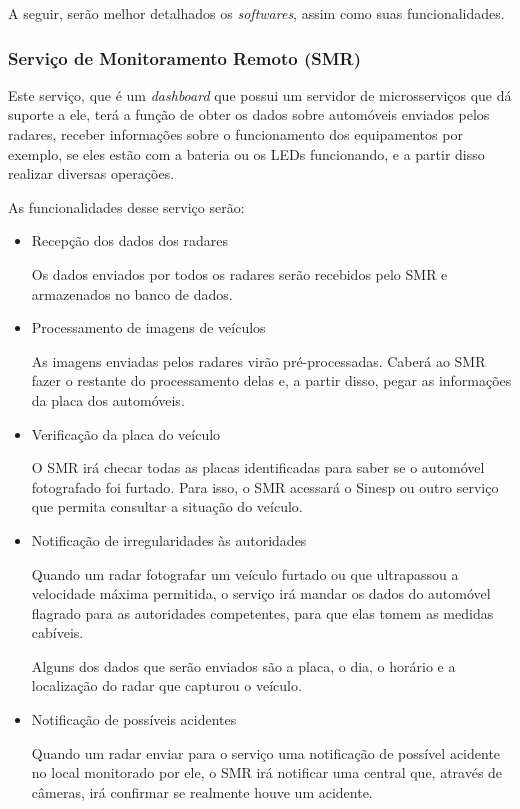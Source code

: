 A seguir, serão melhor detalhados os \emph{softwares}, assim como suas funcionalidades.

\subsubsection{Serviço de Monitoramento Remoto (SMR)}
Este serviço, que é um \emph{dashboard} que possui um servidor de microsserviços que dá suporte a ele, terá a função de obter os dados sobre automóveis enviados pelos radares, receber informações sobre o funcionamento dos equipamentos por exemplo, se eles estão com a bateria ou os LEDs funcionando, e a partir disso realizar diversas operações.

As funcionalidades desse serviço serão:

\begin{itemize}
\item{Recepção dos dados dos radares}

Os dados enviados por todos os radares serão recebidos pelo SMR e armazenados no banco de dados.

\item{Processamento de imagens de veículos}

As imagens enviadas pelos radares virão pré-processadas. Caberá ao SMR fazer o restante do processamento delas e, a partir disso, pegar as informações da placa dos automóveis.

\item{Verificação da placa do veículo}

O SMR irá checar todas as placas identificadas para saber se o automóvel fotografado foi furtado. Para isso, o SMR acessará o Sinesp ou outro serviço que permita consultar a situação do veículo.

\item{Notificação de irregularidades às autoridades}

Quando um radar fotografar um veículo furtado ou que ultrapassou a velocidade máxima permitida, o serviço irá mandar os dados do automóvel flagrado para as autoridades competentes, para que elas tomem as medidas cabíveis.

Alguns dos dados que serão enviados são a placa, o dia, o horário e a localização do radar que capturou o veículo.

\item{Notificação de possíveis acidentes}

Quando um radar enviar para o serviço uma notificação de possível acidente no local monitorado por ele, o SMR irá notificar uma central que, através de câmeras, irá confirmar se realmente houve um acidente.


\end{itemize}

